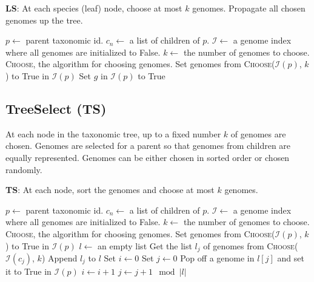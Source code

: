 \documentclass[12pt, letterpaper]{article}
\begin{document}
\begin{algorithm}[h!]
\caption{\textbf{LS}: At each species (leaf) node, choose at most $k$ genomes.  Propagate all chosen genomes up the tree.}
\label{LS}
\begin{algorithmic}
\State $p \gets$ parent taxonomic id.
\State $c_n \gets$ a list of children of $p$.
\State $\mathcal{I} \gets$ a genome index where all genomes are initialized to False.
\State $k \gets$ the number of genomes to choose.
\State \textsc{Choose}, the algorithm for choosing genomes.
 
\State Set genomes from \textsc{Choose}($\mathcal{I}(p)$, $k$) to True in $\mathcal{I}(p)$
\Else {}
\State Set $g$ in $\mathcal{I}(p)$ to True
\EndFor
\EndFor
\EndIf
\EndProcedure
\end{algorithmic}
\end{algorithm}

\newpage

\subsection{TreeSelect (TS)}
At each node in the taxonomic tree, up to a fixed number $k$ of genomes are chosen.  Genomes are selected for a parent so that genomes from children are equally represented.  Genomes can be either chosen in sorted order or chosen randomly.

\begin{algorithm}[h!]
\caption{\textbf{TS}: At each node, sort the genomes and choose at most $k$ genomes.}
\label{TS}
\begin{algorithmic}
\State $p \gets$ parent taxonomic id.
\State $c_n \gets$ a list of children of $p$.
\State $\mathcal{I} \gets$ a genome index where all genomes are initialized to False.
\State $k \gets$ the number of genomes to choose.
\State \textsc{Choose}, the algorithm for choosing genomes.
 
\State Set genomes from \textsc{Choose}($\mathcal{I}(p)$, $k$) to True in $\mathcal{I}(p)$
\Else {}
\State $l \gets$ an empty list
\State Get the list $l_j$ of genomes from \textsc{Choose}($\mathcal{I}(c_j)$, $k$)
\State Append $l_j$ to $l$
\EndFor
\State Set $i \gets 0$ 
\State Set $j \gets 0$ 
 
\State Pop off a genome in $l[j]$ and set it to True in $\mathcal{I}(p)$
\State $i \gets i + 1$
\State $j \gets j + 1 \mod |l|$ 
\EndWhile
\EndIf
\EndProcedure
\end{algorithmic}
\end{algorithm}
\end{document}
